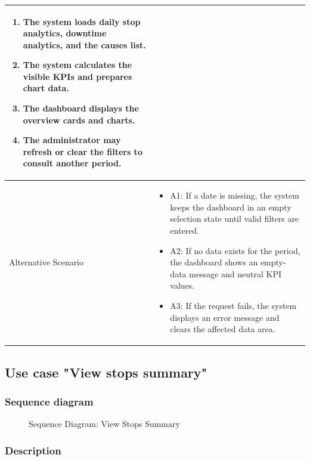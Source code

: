 {\begin{longtable}{|p{}|p{}|}
\begin{enumerate}
\item The system loads daily stop analytics, downtime analytics, and the causes list.
\item The system calculates the visible KPIs and prepares chart data.
\item The dashboard displays the overview cards and charts.
\item The administrator may refresh or clear the filters to consult another period.
\end{enumerate} \\
\hline
Alternative Scenario &
\begin{itemize}
\item A1: If a date is missing, the system keeps the dashboard in an empty selection state until valid filters are entered.
\item A2: If no data exists for the period, the dashboard shows an empty-data message and neutral KPI values.
\item A3: If the request fails, the system displays an error message and clears the affected data area.
\end{itemize} \\
\hline
\end{longtable}
}

\subsection{Use case "View stops summary"}

\subsubsection{Sequence diagram}

\begin{figure}[H]
\centering
{}
\caption{Sequence Diagram: View Stops Summary}
\label{fig:chapter2-view-stops-summary}
\end{figure}

\subsubsection{Description}

